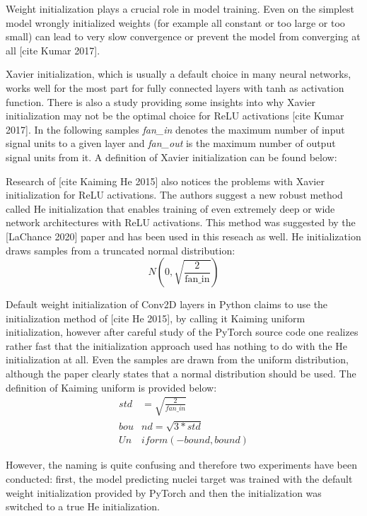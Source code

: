 Weight initialization plays a crucial role in model training. Even on the simplest model wrongly initialized weights (for example all constant or too large or too small) can lead to very slow convergence or prevent the model from converging at all [cite Kumar 2017].

Xavier initialization, which is usually a default choice in many neural networks, works well for the most part for fully connected layers with tanh as activation function. There is also a study providing some insights into why Xavier initialization may not be the optimal choice for ReLU activations [cite Kumar 2017]. In the following samples \textit{fan\_in} denotes the maximum number of input signal units to a given layer and \textit{fan\_out} is the maximum number of output signal units from it. A definition of Xavier initialization can be found below:

Research of [cite Kaiming He 2015] also notices the problems with Xavier initialization for ReLU activations. The authors suggest a new robust method called He initialization that enables training of even extremely deep or wide network architectures with ReLU activations. This method was suggested by the [LaChance 2020] paper and has been used in this reseach as well. He initialization draws samples from a truncated normal distribution:
\begin{equation}
	N(0, \sqrt{\frac{2}{\text{fan\_in}}})
\end{equation}

Default weight initialization of Conv2D layers in Python claims to use the initialization method of [cite He 2015], by calling it Kaiming uniform initialization, however after careful study of the PyTorch source code one realizes rather fast that the initialization approach used has nothing to do with the He initialization at all. Even the samples are drawn from the uniform distribution, although the paper clearly states that a normal distribution should be used. The definition of Kaiming uniform is provided below:
		\begin{align}
			std &= \sqrt{\frac{2}{fan\_in}} \\
			bou&nd = \sqrt{3 * std} \\
			Un&iform(-bound, bound)
		\end{align}

However, the naming is quite confusing and therefore two experiments have been conducted: first, the model predicting nuclei target was trained with the default weight initialization provided by PyTorch and then the initialization was switched to a true He initialization.

